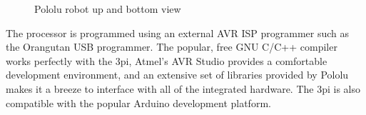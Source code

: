 \begin{figure}[ht]
  \begin{center}
	\hspace{1pt}
  \caption[Pololu robot up and bottom view]{Pololu robot up and bottom view}
  \end{center}
\end{figure}
The processor is programmed using an external AVR ISP programmer such as the Orangutan USB programmer.
The popular, free GNU C/C++ compiler works perfectly with the 3pi, Atmel’s AVR Studio provides a comfortable development environment, and an extensive set of libraries provided by Pololu makes it a breeze to interface with all of the integrated hardware. The 3pi is also compatible with the popular Arduino development platform.

